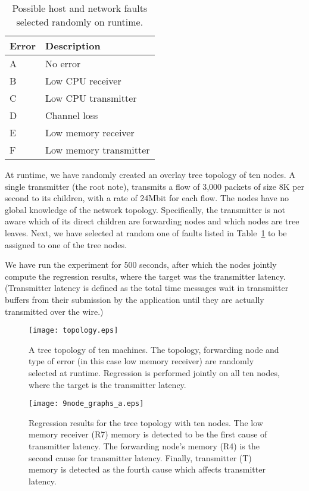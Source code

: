 \documentclass[times, 10pt,twocolumn]{article}
\begin{document}
\begin{table}
  \centering
\begin{tabular}{|l|l|}
  \hline
  Error & Description \\ \hline
A & No error \\
  B & Low CPU receiver \\
  C & Low CPU transmitter \\
  D & Channel loss\\
E & Low memory receiver \\
  F & Low memory transmitter \\
   \hline
\end{tabular}
  \caption{Possible host and network faults selected randomly on runtime.}\label{tab:kfaults}
\end{table}

At runtime, we have randomly created an overlay tree topology of ten nodes. A single transmitter (the root note), transmits a flow of 3,000 packets of size 8K per second to its children, with a rate of 24Mbit for each flow. The nodes have no global knowledge of the network topology. Specifically, the transmitter is not aware which of its direct
children are forwarding nodes and which nodes are tree leaves. Next, we have selected at random one of faults listed in Table~\ref{tab:kfaults} to be assigned to one of the tree nodes.

We have run the experiment for 500 seconds, after which the nodes jointly compute the regression results, where the target was the transmitter latency. (Transmitter latency is defined as the total time messages wait in transmitter buffers from their submission by the application until they are actually transmitted over the wire.)

\begin{figure}[ht!]
\begin{center}
\texttt{[image: topology.eps]}\\
  \caption{A tree topology of ten machines. The topology, forwarding node and type of error (in this case low memory receiver) are randomly selected at runtime. Regression is performed jointly on all ten nodes, where the target is the transmitter latency.}\label{fig:topology}
\end{center}
\end{figure}

\begin{figure}[ht!]
\begin{center}
\texttt{[image: 9node\_graphs\_a.eps]}\\
  \caption{Regression results for the tree topology with ten nodes. The low memory receiver (R7) memory is detected to be the first cause of transmitter latency. The forwarding node's memory (R4) is the second cause for transmitter latency. Finally, transmitter (T) memory is detected as the fourth cause which affects transmitter latency. }\label{fig:9nodes_reg}
\end{center}
\end{figure}
\end{document}
